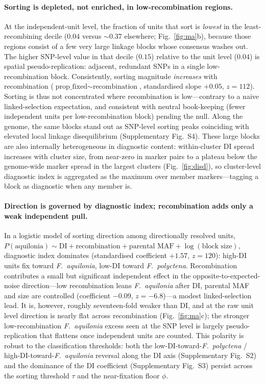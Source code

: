 \documentclass[11pt]{article}
\newcommand{\Faq}{\textit{F.~aquilonia}}
\newcommand{\Fpo}{\textit{F.~polyctena}}
\begin{document}
\paragraph{Sorting is depleted, not enriched, in low-recombination regions.}
At the independent-unit level, the fraction of units that sort is
\emph{lowest} in the least-recombining decile ($0.04$ versus $\sim\!0.37$
elsewhere; Fig.~\ref{fig:ma}b), because those regions consist of a few very large
linkage blocks whose consensus washes out. The higher SNP-level value in that
decile ($0.15$) relative to the unit level ($0.04$) is spatial pseudo-replication:
adjacent, redundant SNPs in a single low-recombination block. Consistently,
sorting magnitude \emph{increases} with recombination
($\text{prop\_fixed}\sim\text{recombination}$, standardised slope $+0.05$,
$z=112$). Sorting is thus not concentrated where recombination is low---contrary
to a naive linked-selection expectation, and consistent with neutral
book-keeping (fewer independent units per low-recombination block) pending the
null. Along the genome, the same blocks stand out as SNP-level sorting peaks
coinciding with elevated local linkage disequilibrium (Supplementary Fig.~S4).
These large blocks are also internally heterogeneous in diagnostic content:
within-cluster DI spread increases with cluster size, from near-zero in marker
pairs to a plateau below the genome-wide marker spread in the largest clusters
(Fig.~\ref{fig:disd}), so cluster-level diagnostic index is aggregated as the
maximum over member markers---tagging a block as diagnostic when any member is.

\paragraph{Direction is governed by diagnostic index; recombination adds only a
weak independent pull.}
In a logistic model of sorting direction among directionally resolved units,
$P(\text{aquilonia}) \sim \text{DI} + \text{recombination} +
\text{parental MAF} + \log(\text{block size})$, diagnostic index dominates
(standardised coefficient $+1.57$, $z=120$): high-DI units fix toward \Faq,
low-DI toward \Fpo. Recombination contributes a small but significant independent
effect in the opposite-to-expected-noise direction---low recombination leans
\Faq{} after DI, parental MAF and size are controlled (coefficient $-0.09$,
$z=-6.8$)---a modest linked-selection lead. It is, however, roughly
seventeen-fold weaker than DI, and at the raw unit level direction is nearly flat
across recombination (Fig.~\ref{fig:ma}c); the stronger low-recombination \Faq{}
excess seen at the SNP level is largely pseudo-replication that flattens once
independent units are counted. This polarity is robust to the classification
thresholds: both the low-DI-toward-\Fpo{} / high-DI-toward-\Faq{} reversal along
the DI axis (Supplementary Fig.~S2) and the dominance of the DI coefficient
(Supplementary Fig.~S3) persist across the sorting threshold $\tau$ and the
near-fixation floor $\phi$.
\end{document}
